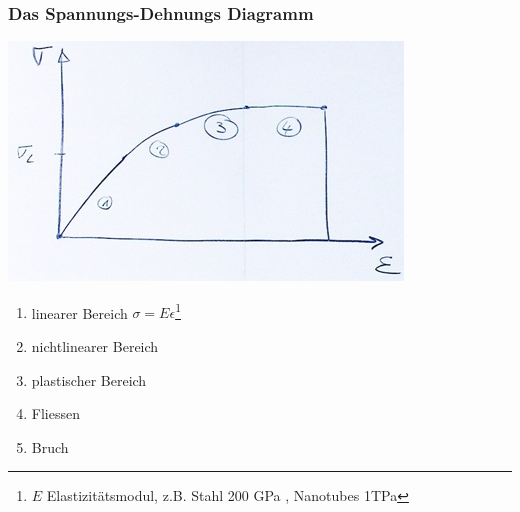 \subsubsection{Das Spannungs-Dehnungs Diagramm}
\includegraphics{Bild42} \\
\begin{enumerate}
	\item linearer Bereich $\sigma = E \epsilon$\footnote{$E$ Elastizitätsmodul, z.B. Stahl 200 GPa , Nanotubes 1TPa}
	\item nichtlinearer Bereich
	\item plastischer Bereich
	\item Fliessen
	\item Bruch
\end{enumerate}

